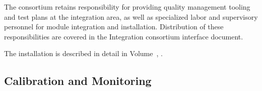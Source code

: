 


The  consortium retains responsibility for providing quality management tooling and test plans at the integration area, as well as specialized labor and supervisory personnel for  module integration and installation. Distribution of these responsibilities are covered in the Integration  consortium interface document.



The installation is described in detail in 
Volume~\volnumbertc{}, \voltitletc{}.




\subsection{Calibration and Monitoring}
\label{sec:fdsp-pd-intfc-calib}



